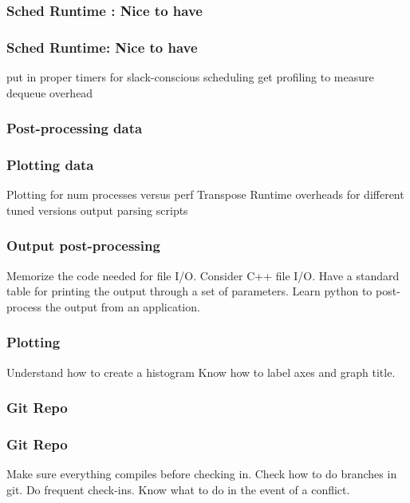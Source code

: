 \subsubsection{Sched Runtime : Nice to have}
\begin{frame}
\frametitle{Sched Runtime: Nice to have}
\begin{enumerate} 
\bllt put in proper timers for slack-conscious scheduling
\bllt get profiling to measure dequeue overhead 
\end{enumerate} 
\end{frame} 

\subsubsection{Post-processing data}
\begin{frame}
\frametitle{Plotting data}
\begin{enumerate} 
\bllt Plotting for num processes versus perf 
\bllt Transpose
\bllt Runtime overheads for different tuned versions
\bllt output parsing scripts 
\end{enumerate} 
\end{frame} 

\begin{frame}
\frametitle{Output post-processing}
\begin{enumerate} 
\bllt Memorize the code needed for file I/O. Consider C++ file I/O. 
\bllt Have a standard table for printing the output through a set of parameters.
\bllt Learn python to post-process the output from an application. 
\end{enumerate} 
\end{frame} 

\begin{frame}
\frametitle{Plotting}
\begin{enumerate} 
\bllt Understand how to create a histogram 
\bllt Know how to label axes and graph title. 
\end{enumerate} 
\end{frame} 

\subsubsection{Git Repo}
\begin{frame}
\frametitle{Git Repo}
\begin{enumerate} 
\bllt Make sure everything compiles before checking in. 
\bllt Check how to do branches in git. 
\bllt Do frequent check-ins. 
\bllt Know what to do in the event of a conflict. 
\end{enumerate} 
\end{frame} 

